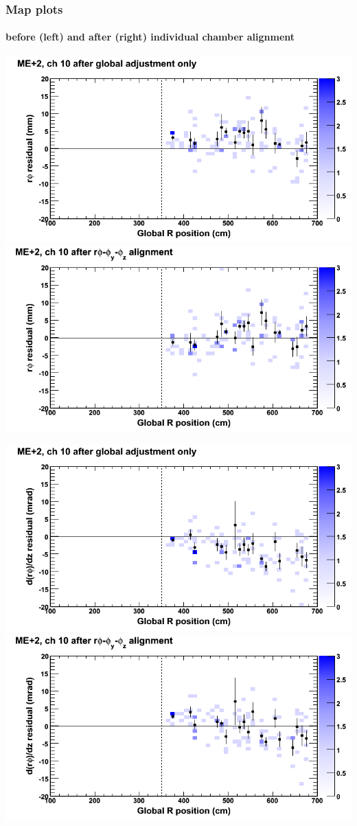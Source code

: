 \documentclass[compress]{beamer}
\begin{document}
\begin{frame}
\frametitle{Map plots}
\framesubtitle{before (left) and after (right) individual chamber alignment}
\includegraphics[width=0.5\linewidth]{ringmapplots_3dof/before_CSCvsr_mep2ch10_x.png} \includegraphics[width=0.5\linewidth]{ringmapplots_3dof/after_CSCvsr_mep2ch10_x.png}

\includegraphics[width=0.5\linewidth]{ringmapplots_3dof/before_CSCvsr_mep2ch10_dxdz.png} \includegraphics[width=0.5\linewidth]{ringmapplots_3dof/after_CSCvsr_mep2ch10_dxdz.png}
\end{frame}
\end{document}
